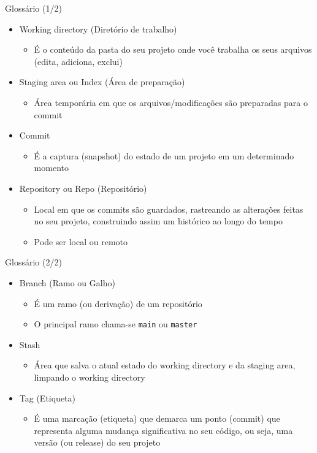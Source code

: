 \documentclass[aspectratio=169,14pt]{beamer}
\begin{document}
\begin{frame}{Glossário (1/2)}
    \begin{itemize}
        \item Working directory (Diretório de trabalho)
        \begin{itemize}
            \item É o conteúdo da pasta do seu projeto onde você trabalha os
            seus arquivos (edita, adiciona, exclui)
        \end{itemize}
        \item Staging area ou Index (Área de preparação)
        \begin{itemize}
            \item Área temporária em que os arquivos/modificações são preparadas
            para o commit 
        \end{itemize}
        \item Commit
        \begin{itemize}
            \item É a captura (snapshot) do estado de um projeto em um
            determinado momento
        \end{itemize}
        \item Repository ou Repo (Repositório)
        \begin{itemize}
            \item Local em que os commits são guardados, rastreando as
            alterações feitas no seu projeto, construindo assim um histórico ao
            longo do tempo
            \item Pode ser local ou remoto
        \end{itemize}
    \end{itemize}
\end{frame}

\begin{frame}{Glossário (2/2)}
    \begin{itemize}
        \item Branch (Ramo ou Galho)
        \begin{itemize}
            \item É um ramo (ou derivação) de um repositório
            \item O principal ramo chama-se \texttt{main} ou \texttt{master}
        \end{itemize}
        \item Stash
        \begin{itemize}
            \item Área que salva o atual estado do working directory e da
            staging area, limpando o working directory
        \end{itemize}
        \item Tag (Etiqueta)
        \begin{itemize}
            \item É uma marcação (etiqueta) que demarca um ponto (commit) que
            representa alguma mudança significativa no seu código, ou seja, uma
            versão (ou release) do seu projeto
        \end{itemize}        
    \end{itemize}
\end{frame}
\end{document}
